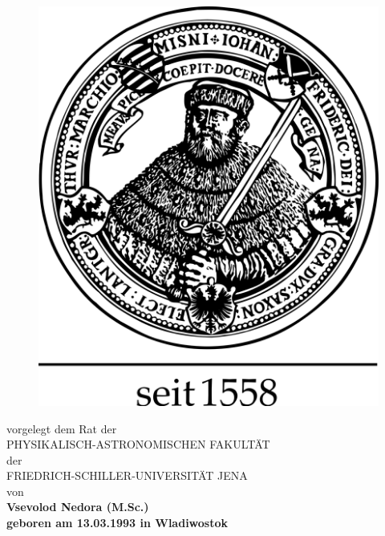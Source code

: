 \documentclass[
openright,
12pt, %
english,%
onehalfspacing, %
nolistspacing, %
nohyperref, %
headsepline, %
]{MastersDoctoralThesis} %
\begin{document}
\begin{titlepage}
\begin{center}
        \begin{figure}[!ht]
            \centering
            \includegraphics[scale=0.05]{uni_jena_logo.png}
        \end{figure}
        
        \vspace{0.8cm}
        vorgelegt dem Rat der \\
        \vspace{0.3cm}
        PHYSIKALISCH-ASTRONOMISCHEN FAKULT{\"A}T \\
        \vspace{0.3cm}
        der \\
        \vspace{0.3cm}
        FRIEDRICH-SCHILLER-UNIVERSIT{\"A}T JENA \\
        \vspace{0.3cm}
        von \\
        \vspace{0.3cm}
        \bf{Vsevolod Nedora (M.Sc.)} \\
        \vspace{0.3cm}
        geboren am 13.03.1993 in Wladiwostok
        

\end{center}
\end{titlepage}
\end{document}
